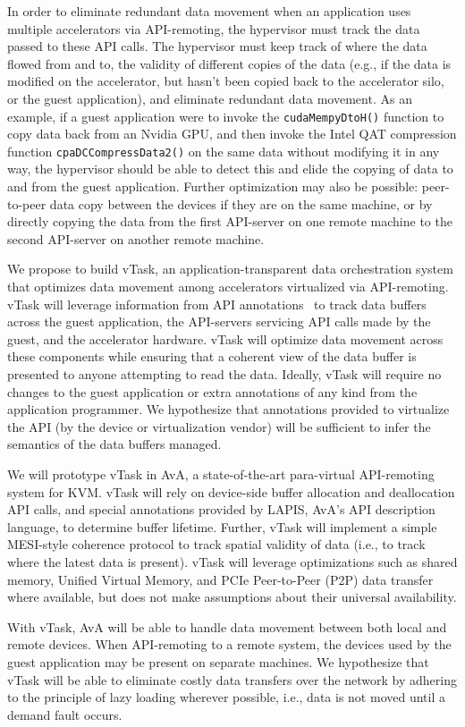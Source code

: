 In order to eliminate redundant data movement when an application uses multiple accelerators via API-remoting, the hypervisor must track the data passed to these API calls. The hypervisor must keep track of where the data flowed from and to, the validity of different copies of the data (e.g., if the data is modified on the accelerator, but hasn’t been copied back to the accelerator silo, or the guest application), and eliminate redundant data movement. As an example, if a guest application were to invoke the \texttt{cudaMempyDtoH()} function to copy data back from an Nvidia GPU, and then invoke the Intel QAT compression function \texttt{cpaDCCompressData2()} on the same data without modifying it in any way, the hypervisor should be able to detect this and elide the copying of data to and from the guest application. Further optimization may also be possible: peer-to-peer data copy between the devices if they are on the same machine, or by directly copying the data from the first API-server on one remote machine to the second API-server on another remote machine.

We propose to build vTask, an application-transparent data orchestration system that optimizes data movement among accelerators virtualized via API-remoting. vTask will leverage information from API annotations~\cite{ava-hotos} to track data buffers across the guest application, the API-servers servicing API calls made by the guest, and the accelerator hardware. vTask will optimize data movement across these components while ensuring that a coherent view of the data buffer is presented to anyone attempting to read the data. Ideally, vTask will require no changes to the guest application or  extra annotations of any kind from the application programmer. We hypothesize that annotations provided to virtualize the API (by the device or virtualization vendor) will be sufficient to infer the semantics of the data buffers managed.

We will prototype vTask in AvA, a state-of-the-art para-virtual API-remoting system for KVM. vTask will rely on device-side buffer allocation and deallocation API calls, and special annotations provided by LAPIS, AvA’s API description language, to determine buffer lifetime. Further, vTask will implement a simple MESI-style coherence protocol to track spatial validity of data (i.e., to track where the latest data is present). vTask will leverage optimizations such as shared memory, Unified Virtual Memory, and PCIe Peer-to-Peer (P2P) data transfer where available, but does not make assumptions about their universal availability.

With vTask, AvA will be able to handle data movement between both local and remote devices. When API-remoting to a remote system, the devices used by the guest application may be present on separate machines. We hypothesize that vTask will be able to eliminate costly data transfers over the network by adhering to the principle of lazy loading wherever possible, i.e., data is not moved until a demand fault occurs.

